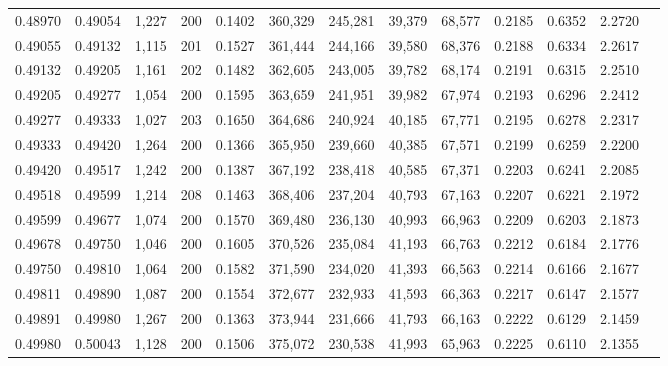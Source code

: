 \begin{tabular}{rrrrrrrrrrrrr}
0.48970 & 0.49054 & 1,227 & 200 &                                     0.1402 & 360,329 & 245,281 &  39,379 &  68,577 & 0.2185 & 0.6352 & 2.2720 \\
0.49055 & 0.49132 & 1,115 & 201 &                                     0.1527 & 361,444 & 244,166 &  39,580 &  68,376 & 0.2188 & 0.6334 & 2.2617 \\
0.49132 & 0.49205 & 1,161 & 202 &                                     0.1482 & 362,605 & 243,005 &  39,782 &  68,174 & 0.2191 & 0.6315 & 2.2510 \\
0.49205 & 0.49277 & 1,054 & 200 &                                     0.1595 & 363,659 & 241,951 &  39,982 &  67,974 & 0.2193 & 0.6296 & 2.2412 \\
0.49277 & 0.49333 & 1,027 & 203 &                                     0.1650 & 364,686 & 240,924 &  40,185 &  67,771 & 0.2195 & 0.6278 & 2.2317 \\
0.49333 & 0.49420 & 1,264 & 200 &                                     0.1366 & 365,950 & 239,660 &  40,385 &  67,571 & 0.2199 & 0.6259 & 2.2200 \\
0.49420 & 0.49517 & 1,242 & 200 &                                     0.1387 & 367,192 & 238,418 &  40,585 &  67,371 & 0.2203 & 0.6241 & 2.2085 \\
0.49518 & 0.49599 & 1,214 & 208 &                                     0.1463 & 368,406 & 237,204 &  40,793 &  67,163 & 0.2207 & 0.6221 & 2.1972 \\
0.49599 & 0.49677 & 1,074 & 200 &                                     0.1570 & 369,480 & 236,130 &  40,993 &  66,963 & 0.2209 & 0.6203 & 2.1873 \\
0.49678 & 0.49750 & 1,046 & 200 &                                     0.1605 & 370,526 & 235,084 &  41,193 &  66,763 & 0.2212 & 0.6184 & 2.1776 \\
0.49750 & 0.49810 & 1,064 & 200 &                                     0.1582 & 371,590 & 234,020 &  41,393 &  66,563 & 0.2214 & 0.6166 & 2.1677 \\
0.49811 & 0.49890 & 1,087 & 200 &                                     0.1554 & 372,677 & 232,933 &  41,593 &  66,363 & 0.2217 & 0.6147 & 2.1577 \\
0.49891 & 0.49980 & 1,267 & 200 &                                     0.1363 & 373,944 & 231,666 &  41,793 &  66,163 & 0.2222 & 0.6129 & 2.1459 \\
0.49980 & 0.50043 & 1,128 & 200 &                                     0.1506 & 375,072 & 230,538 &  41,993 &  65,963 & 0.2225 & 0.6110 & 2.1355 \\

\end{tabular}
